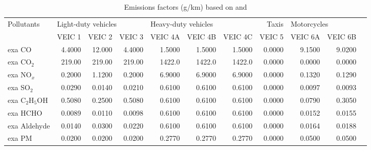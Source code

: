 
\begin{table} %
\begin{threeparttable}[b]
\caption{Emissions factors (g/km) based on \citet{Perez2014} and \citet{Andrade2015, Andrade_agu2019}}\label{tab:ef}
\begin{tabular}{@{} lrrrrrrrrrr @{} }
\toprule
Pollutants \tnote{a} & \multicolumn{3}{l}{Light-duty vehicles \tnote{b}} & \multicolumn{3}{l}{Heavy-duty vehicles \tnote{c} } & Taxis \tnote{d} & \multicolumn{2}{l}{Motorcycles \tnote{e} }  \\ 
\cline{2-10}
            & VEIC 1 & VEIC 2 & VEIC 3                  & VEIC 4A & VEIC 4B & VEIC 4C               & VEIC 5                                   & VEIC 6A & VEIC 6B                 \\ 
\midrule
exa CO     & 4.4000 & 12.000 & 4.4000                  & 1.5000  & 1.5000  & 1.5000                & 0.0000                                   & 9.1500  & 9.0200                  \\
exa CO$_2$    & 219.00 & 219.00 & 219.00                  & 1422.0  & 1422.0  & 1422.0                & 0.0000                                   & 0.0000  & 0.0000                  \\
exa NO$_x$    & 0.2000 & 1.1200 & 0.2000                  & 6.9000  & 6.9000  & 6.9000                & 0.0000                                   & 0.1320  & 0.1290                  \\
exa SO$_2$    & 0.0290 & 0.0140 & 0.0210                  & 0.6100  & 0.6100  & 0.6100                & 0.0000                                   & 0.0097  & 0.0093                  \\
exa C$_2$H$_5$OH & 0.5080 & 0.2500 & 0.5080                  & 0.6100  & 0.6100  & 0.6100                & 0.0000                                   & 0.0790  & 0.3050                  \\
exa HCHO   & 0.0089 & 0.0110 & 0.0098                  & 0.6100  & 0.6100  & 0.6100                & 0.0000                                   & 0.0152  & 0.0155                  \\
exa Aldehyde    & 0.0140 & 0.0300 & 0.0220                  & 0.6100  & 0.6100  & 0.6100                & 0.0000                                   & 0.0164  & 0.0188                  \\
exa PM     & 0.0200 & 0.0200 & 0.0200                  & 0.2770  & 0.2770  & 0.2770                & 0.0000                                   & 0.0500  & 0.0500                  \\

\end{tabular}
\end{threeparttable}
\end{table}

